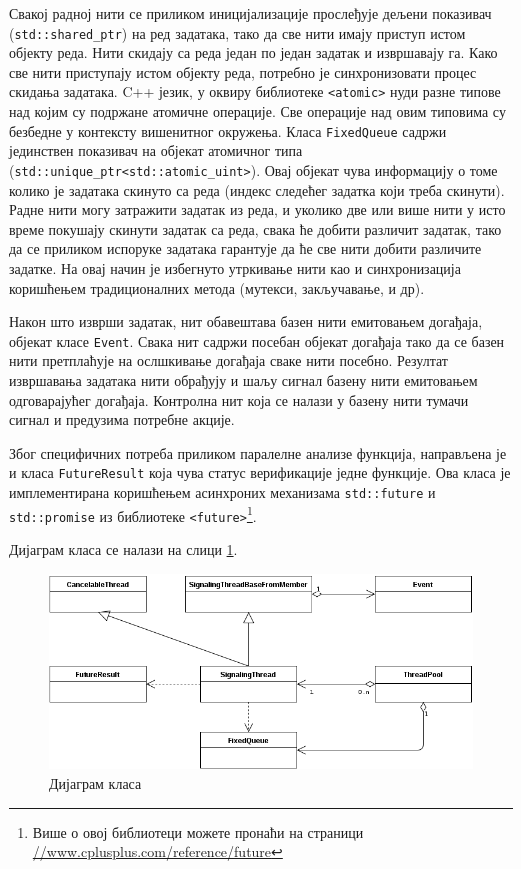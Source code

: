 \documentclass[12pt,oneside]{memoir}
\begin{document}
Свакој радној нити се приликом иницијализације прослеђује дељени показивач (\texttt{std::shared\_ptr}) на ред задатака, тако да све нити имају приступ истом објекту реда. Нити скидају са реда један по један задатак и извршавају га. Како све нити приступају истом објекту реда, потребно је синхронизовати процес скидања задатака. C++ језик, у оквиру библиотеке \texttt{<atomic>} нуди разне типове над којим су подржане атомичне операције. Све операције над овим типовима су безбедне у контексту вишенитног окружења. Класа \texttt{FixedQueue} садржи јединствен показивач на објекат атомичног типа (\texttt{std::unique\_ptr<std::atomic\_uint>}). Овај објекат чува информацију о томе колико је задатака скинуто са реда (индекс следећег задатка који треба скинути). Радне нити могу затражити задатак из реда, и уколико две или више нити у исто време покушају скинути задатак са реда, свака ће добити различит задатак, тако да се приликом испоруке задатака гарантује да ће све нити добити различите задатке.  На овај начин је избегнуто утркивање нити као и синхронизација коришћењем традиционалних метода (мутекси, закључавање, и др). 

Након што изврши задатак, нит обавештава базен нити емитовањем догађаја, објекат класе  \texttt{Event}. Свака нит садржи посебан објекат догађаја тако да се базен нити претплаћује на ослшкивање догађаја сваке нити посебно. Резултат извршавања задатака нити обрађују и шаљу сигнал базену нити емитовањем одговарајућег догађаја. Контролна нит која се налази у базену нити тумачи сигнал и предузима потребне акције. 

Због специфичних потреба приликом паралелне анализе функција, направљена је и класа \texttt{FutureResult} која чува статус верификације једне функције. Ова класа је имплементирана коришћењем асинхроних механизама \texttt{std::future} и \texttt{std::promise} из библиотеке \texttt{<future>}\footnote{Више о овој библиотеци можете пронаћи на страници \url{//www.cplusplus.com/reference/future}}.	

Дијаграм класа се налази на слици \ref{fig:klasa_dij}.
 
 
 \begin{figure}[!ht]
  \centering
  \includegraphics[width=1.0\textwidth]{class_diag.png}
  \caption{Дијаграм класа}
  \label{fig:klasa_dij}
\end{figure}
\end{document}

